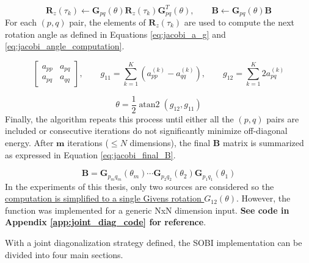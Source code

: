 \begin{equation}
    \mathbf{R}_z(\tau_k)
    \leftarrow
    \mathbf{G}_{pq}(\theta)
    \mathbf{R}_z(\tau_k)
    \mathbf{G}_{pq}^{T}(\theta), \qquad
    \mathbf{B}
    \leftarrow
    \mathbf{G}_{pq}(\theta)\mathbf{B}
    \label{eq:givens_update}
\end{equation}
For each $(p,q)$ pair, the elements of $\mathbf{R}_z(\tau_k)$ are used to compute the next rotation angle as defined in Equations \ref{eq:jacobi_a_g} and \ref{eq:jacobi_angle_computation}.

\begin{equation}
    \begin{bmatrix}
a_{pp} & a_{pq} \\
a_{pq} & a_{qq}
\end{bmatrix}, 
\qquad 
g_{11}
    =
    \sum_{k=1}^{K}
    \left(
        a_{pp}^{(k)} - a_{qq}^{(k)}
    \right), \qquad
g_{12}
    =
    \sum_{k=1}^{K}
    2a_{pq}^{(k)}
    \label{eq:jacobi_a_g}
\end{equation}

\begin{equation}
    \theta
    =
    \frac{1}{2}
    \operatorname{atan2}
    \left(
        g_{12}, g_{11}
    \right)
    \label{eq:jacobi_angle_computation}
\end{equation}
Finally, the algorithm repeats this process until either all the $(p,q)$ pairs are included or consecutive iterations do not significantly minimize off-diagonal energy. After $\mathbf{m}$ iterations ($\leq N$ dimensions), the final $\mathbf{B}$ matrix is summarized as expressed in Equation \ref{eq:jacobi_final_B}.

\begin{equation}
    \mathbf{B}
    =
    \mathbf{G}_{p_m q_m}(\theta_m)
    \cdots
    \mathbf{G}_{p_2 q_2}(\theta_2)
    \mathbf{G}_{p_1 q_1}(\theta_1)
    \label{eq:jacobi_final_B}
\end{equation}
In the experiments of this thesis, only two sources are considered so the \uline{computation is simplified to a single Givens rotation $G_{12}(\theta)$}. However, the function was implemented for a generic NxN dimension input. \textbf{See code in Appendix \ref{app:joint_diag_code} for reference}. 

\clearpage

\noindent With a joint diagonalization strategy defined, the SOBI implementation can be divided into four main sections.


